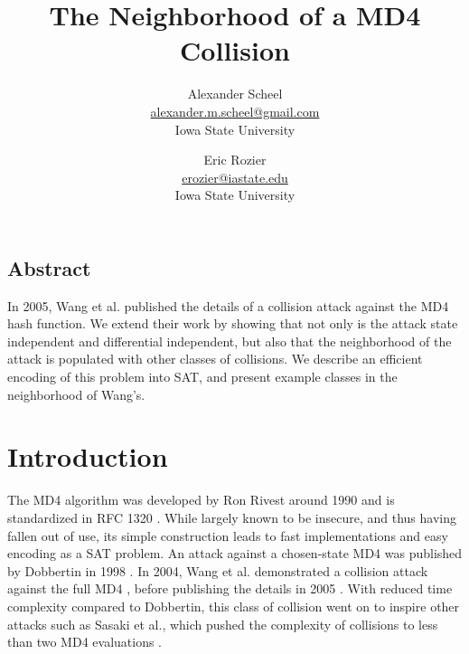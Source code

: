 \documentclass[letterpaper,twocolumn,10pt]{article}
\begin{document}
\date{}

\title{\Large \bf The Neighborhood of a MD4 Collision }

\author{
{\rm Alexander Scheel}\\
\href{mailto:alexander.m.scheel@gmail.com}{alexander.m.scheel@gmail.com} \\
Iowa State University
\and
{\rm Eric Rozier}\\
\href{mailto:erozier@iastate.edu}{erozier@iastate.edu} \\
Iowa State University
}

\maketitle



\subsection*{Abstract}

In 2005, Wang et al. published the details of a collision attack against the
MD4 hash function. We extend their work by showing that not
only is the attack state independent and differential independent, but also
that the neighborhood of the attack is populated with other classes of
collisions. We describe an efficient encoding of this problem into SAT,
and present example classes in the neighborhood of Wang's.

\section{Introduction}
The MD4 algorithm was developed by Ron Rivest around 1990 and is standardized
in RFC 1320 \cite{rfc1320}. While largely known to be insecure, and thus
having fallen out of use, its simple construction leads to fast implementations
and easy encoding as a SAT problem. An attack against a chosen-state MD4 was
published by Dobbertin in 1998 \cite{Dobbertin1998}. In 2004, Wang et al.
demonstrated a collision attack against the full MD4
\cite{cryptoeprint:2004:199}, before publishing the details in 2005
\cite{Wang2005}. With reduced time complexity compared to Dobbertin, this
class of collision went on to inspire other attacks such as Sasaki et al.,
which pushed the complexity of collisions to less than two MD4 evaluations
\cite{Sasaki2007}.
\end{document}
